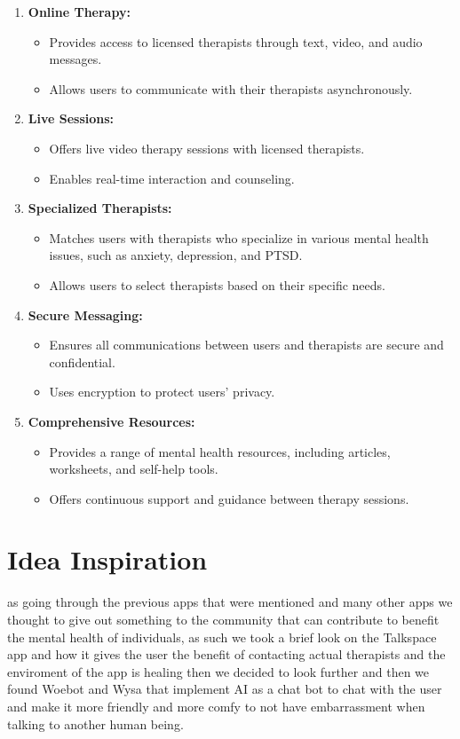 \begin{enumerate}
    \item \textbf{Online Therapy:}
    \begin{itemize}
        \item Provides access to licensed therapists through text, video, and audio messages.
        \item Allows users to communicate with their therapists asynchronously.
    \end{itemize}
    \item \textbf{Live Sessions:}
    \begin{itemize}
        \item Offers live video therapy sessions with licensed therapists.
        \item Enables real-time interaction and counseling.
    \end{itemize}
    \item \textbf{Specialized Therapists:}
    \begin{itemize}
        \item Matches users with therapists who specialize in various mental health issues, such as anxiety, depression, and PTSD.
        \item Allows users to select therapists based on their specific needs.
    \end{itemize}
    \item \textbf{Secure Messaging:}
    \begin{itemize}
        \item Ensures all communications between users and therapists are secure and confidential.
        \item Uses encryption to protect users' privacy.
    \end{itemize}
    \item \textbf{Comprehensive Resources:}
    \begin{itemize}
        \item Provides a range of mental health resources, including articles, worksheets, and self-help tools.
        \item Offers continuous support and guidance between therapy sessions.
    \end{itemize}
\end{enumerate}

\section{Idea Inspiration}
as going through the previous apps that were mentioned and many other apps we thought to give out something to the community that can contribute to benefit the mental health of individuals, as such we took a brief look on the Talkspace app and how it gives the user the benefit of contacting actual therapists and the enviroment of the app is healing then we decided to look further and then we found Woebot and Wysa that implement AI as a chat bot to chat with the user and make it more friendly and more comfy to not have embarrassment when talking to another human being.


